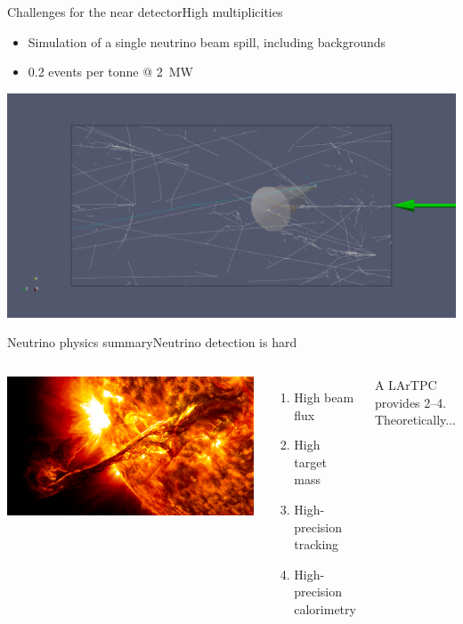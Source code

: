 \documentclass[]{beamer}
\newcommand*{\emphcol}{red}
\newcommand*{\lartpc}{{LArTPC}}
\begin{document}
\begin{frame}{Challenges for the near detector}{High multiplicities}
	\begin{itemize}
		\item Simulation of a single neutrino beam spill, including backgrounds
		\item {\color{\emphcol} \num{0.2} \Pgn events per tonne @ \SI{2}{\mega\watt}}
	\end{itemize}
	\centering
	\includegraphics[width=\textwidth]{defence/uid0_spill6_event461_gamma19_x}
\end{frame}

\begin{frame}{Neutrino physics summary}{Neutrino detection is hard}
	\begin{columns}[c]
		\centering
		\includegraphics[width=.8\textheight, angle=-90]{defence/sun}
		\begin{enumerate}
			\item High beam flux
			\item High target mass
			\item High-precision tracking
			\item High-precision calorimetry
		\end{enumerate}
		{\color{\emphcol}A \lartpc{} provides \numrange{2}{4}.\\Theoretically...}
	\end{columns}
\end{frame}
\end{document}
